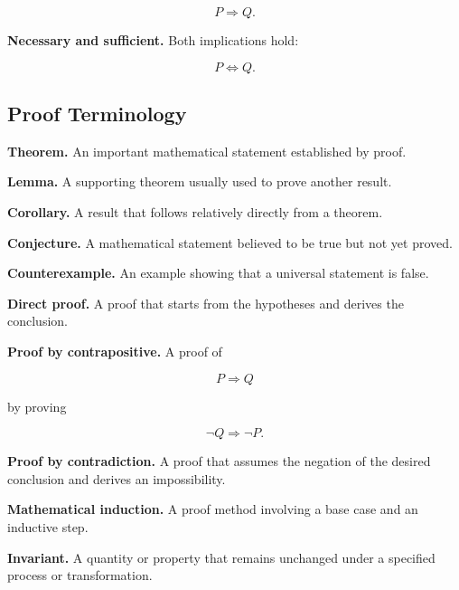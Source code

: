 \[
\boxed{
P\Rightarrow Q.
}
\]

\medskip

\textbf{Necessary and sufficient.}
Both implications hold:

\[
\boxed{
P\iff Q.
}
\]

\subsection{Proof Terminology}
\label{subsec:proof-terminology-reference}

\textbf{Theorem.}
An important mathematical statement established by proof.

\medskip

\textbf{Lemma.}
A supporting theorem usually used to prove another result.

\medskip

\textbf{Corollary.}
A result that follows relatively directly from a theorem.

\medskip

\textbf{Conjecture.}
A mathematical statement believed to be true but not yet proved.

\medskip

\textbf{Counterexample.}
An example showing that a universal statement is false.

\medskip

\textbf{Direct proof.}
A proof that starts from the hypotheses and derives the conclusion.

\medskip

\textbf{Proof by contrapositive.}
A proof of

\[
P\Rightarrow Q
\]

by proving

\[
\neg Q\Rightarrow\neg P.
\]

\medskip

\textbf{Proof by contradiction.}
A proof that assumes the negation of the desired conclusion and derives an
impossibility.

\medskip

\textbf{Mathematical induction.}
A proof method involving a base case and an inductive step.

\medskip

\textbf{Invariant.}
A quantity or property that remains unchanged under a specified process or
transformation.

